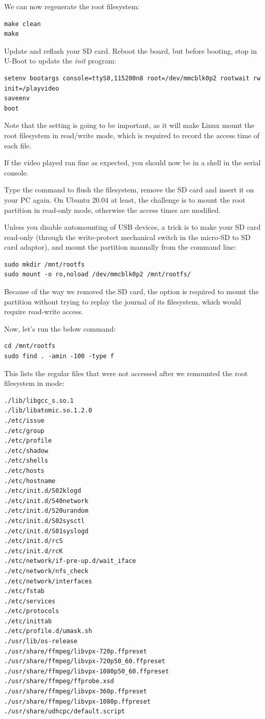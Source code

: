 We can now regenerate the root filesystem:
\begin{verbatim}
make clean
make
\end{verbatim}

Update and reflash your SD card. Reboot the board, but before booting,
stop in U-Boot to update the {\em init} program:

\begin{verbatim}
setenv bootargs console=ttyS0,115200n8 root=/dev/mmcblk0p2 rootwait rw init=/playvideo
saveenv
boot
\end{verbatim}

Note that the  setting is going to be important, as it will
make Linux mount the root filesystem in read/write mode, which is
required to record the access time of each file.

If the video played ran fine as expected, you should now be in a shell
in the serial console.

Type the  command to flush the filesystem, remove the SD card
and insert it on your PC again. On Ubuntu 20.04 at least, the challenge
is to mount the root partition in read-only mode, otherwise the
access times are modified.

Unless you disable automounting of USB devices, a trick is to
make your SD card read-only (through the write-protect mechanical
switch in the micro-SD to SD card adaptor), and mount the partition
manually from the command line:

\begin{verbatim}
sudo mkdir /mnt/rootfs
sudo mount -o ro,noload /dev/mmcblk0p2 /mnt/rootfs/
\end{verbatim}

Because of the way we removed the SD card, the 
option is required to mount the partition without trying to
replay the journal of its filesystem, which would require
read-write access.

Now, let's run the below command:

\begin{verbatim}
cd /mnt/rootfs
sudo find . -amin -100 -type f
\end{verbatim}

This lists the regular files that were not accessed after we remounted
the root filesystem in  mode:

\begin{verbatim}
./lib/libgcc_s.so.1
./lib/libatomic.so.1.2.0
./etc/issue
./etc/group
./etc/profile
./etc/shadow
./etc/shells
./etc/hosts
./etc/hostname
./etc/init.d/S02klogd
./etc/init.d/S40network
./etc/init.d/S20urandom
./etc/init.d/S02sysctl
./etc/init.d/S01syslogd
./etc/init.d/rcS
./etc/init.d/rcK
./etc/network/if-pre-up.d/wait_iface
./etc/network/nfs_check
./etc/network/interfaces
./etc/fstab
./etc/services
./etc/protocols
./etc/inittab
./etc/profile.d/umask.sh
./usr/lib/os-release
./usr/share/ffmpeg/libvpx-720p.ffpreset
./usr/share/ffmpeg/libvpx-720p50_60.ffpreset
./usr/share/ffmpeg/libvpx-1080p50_60.ffpreset
./usr/share/ffmpeg/ffprobe.xsd
./usr/share/ffmpeg/libvpx-360p.ffpreset
./usr/share/ffmpeg/libvpx-1080p.ffpreset
./usr/share/udhcpc/default.script
\end{verbatim}

